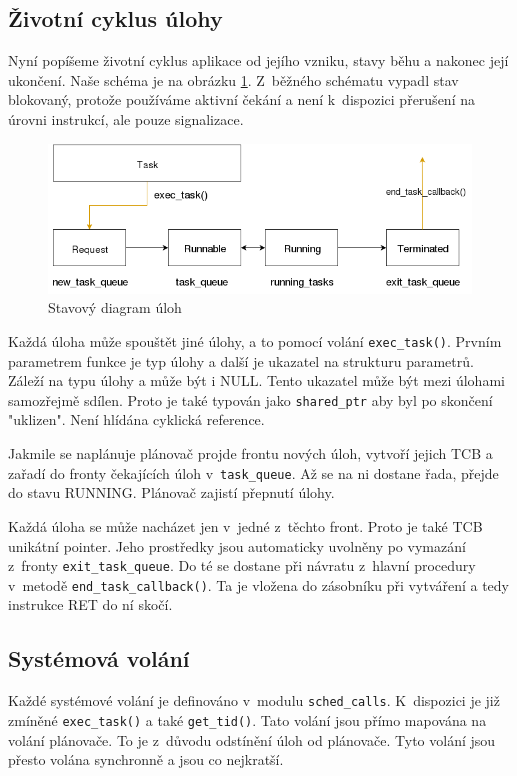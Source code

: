 \documentclass[a4paper,12pt]{article}
\begin{document}
\subsection{Životní cyklus úlohy}
Nyní popíšeme životní cyklus aplikace od jejího vzniku, stavy běhu a nakonec její
ukončení. Naše schéma je na obrázku \ref{fig:state_diagram}. Z~běžného schématu
vypadl stav blokovaný, protože používáme aktivní čekání a není k~dispozici
přerušení na úrovni instrukcí, ale pouze signalizace.

\begin{figure}
\centering
\includegraphics[width=\textwidth]{obrazky/state_diagram.png}
\caption{Stavový diagram úloh}
\label{fig:state_diagram}
\end{figure}

Každá úloha může spouštět jiné úlohy, a to pomocí volání \verb+exec_task()+. Prvním
parametrem funkce je typ úlohy a další je ukazatel na strukturu parametrů. Záleží na typu úlohy a
může být i NULL. Tento ukazatel může být mezi úlohami samozřejmě sdílen. Proto je také
typován jako \verb+shared_ptr+ aby byl po skončení "uklizen". Není hlídána cyklická
reference.

Jakmile se naplánuje plánovač projde frontu nových úloh, vytvoří jejich TCB a zařadí
do fronty čekajících úloh v~\verb+task_queue+.
Až se na ni dostane řada, přejde do stavu RUNNING. Plánovač zajistí přepnutí úlohy.

Každá úloha se může nacházet jen v~jedné z~těchto front. Proto je také TCB unikátní pointer.
Jeho prostředky jsou automaticky uvolněny po vymazání z~fronty
\verb+exit_task_queue+. Do té se dostane při návratu z~hlavní procedury v~metodě
\verb+end_task_callback()+. Ta je vložena do zásobníku při vytváření a tedy instrukce
RET do ní skočí.

\subsection{Systémová volání}
Každé systémové volání je definováno v~modulu \verb+sched_calls+. K~dispozici
je již zmíněné \verb+exec_task()+ a také \verb+get_tid()+. Tato volání jsou přímo
mapována na volání plánovače. To je z~důvodu odstínění úloh od plánovače. Tyto
volání jsou přesto volána synchronně a jsou co nejkratší.
\end{document}
